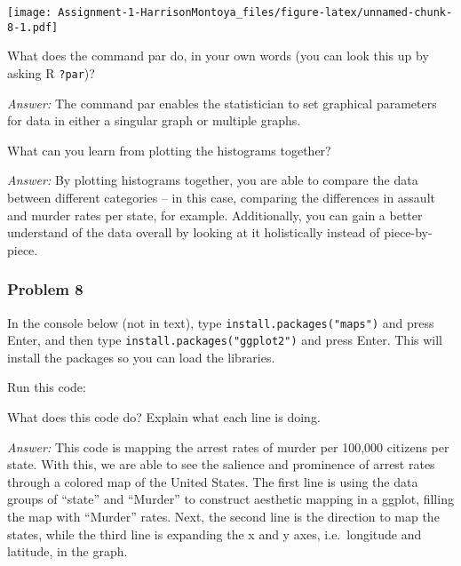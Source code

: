 \documentclass[
]{article}
\newenvironment{Shaded}{\begin{snugshade}}{\end{snugshade}}
\newcommand{\AttributeTok}[1]{\textcolor[rgb]{0.77,0.63,0.00}{#1}}
\newcommand{\FunctionTok}[1]{\textcolor[rgb]{0.00,0.00,0.00}{#1}}
\newcommand{\NormalTok}[1]{#1}
\newcommand{\SpecialCharTok}[1]{\textcolor[rgb]{0.00,0.00,0.00}{#1}}
\newcommand{\StringTok}[1]{\textcolor[rgb]{0.31,0.60,0.02}{#1}}
\begin{document}
\texttt{[image: Assignment-1-HarrisonMontoya\_files/figure-latex/unnamed-chunk-8-1.pdf]}

What does the command par do, in your own words (you can look this up by
asking R \texttt{?par})?

\emph{Answer:} The command par enables the statistician to set graphical
parameters for data in either a singular graph or multiple graphs.

What can you learn from plotting the histograms together?

\emph{Answer:} By plotting histograms together, you are able to compare
the data between different categories -- in this case, comparing the
differences in assault and murder rates per state, for example.
Additionally, you can gain a better understand of the data overall by
looking at it holistically instead of piece-by-piece.

\hypertarget{problem-8}{%
\subsubsection{Problem 8}\label{problem-8}}

In the console below (not in text), type
\texttt{install.packages("maps")} and press Enter, and then type
\texttt{install.packages("ggplot2")} and press Enter. This will install
the packages so you can load the libraries.

Run this code:

\begin{Shaded}
\end{Shaded}

What does this code do? Explain what each line is doing.

\emph{Answer:} This code is mapping the arrest rates of murder per
100,000 citizens per state. With this, we are able to see the salience
and prominence of arrest rates through a colored map of the United
States. The first line is using the data groups of ``state'' and
``Murder'' to construct aesthetic mapping in a ggplot, filling the map
with ``Murder'' rates. Next, the second line is the direction to map the
states, while the third line is expanding the x and y axes,
i.e.~longitude and latitude, in the graph.
\end{document}
